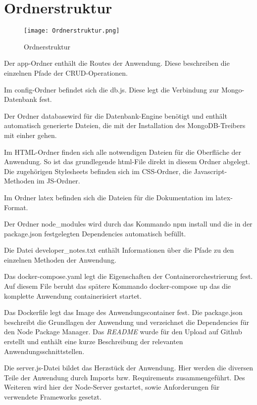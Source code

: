 
\chapter{Ordnerstruktur}
\label{ch:Ordnerstruktur}
\begin{wrapfigure}{r}{.4\textwidth}
\centering
\texttt{[image: Ordnerstruktur.png]}
\vspace{1pt}
\caption{Ordnerstruktur}
\label{fig:Ordnerstruktur}
\end{wrapfigure}

Der app-Ordner enthält die Routes der Anwendung. Diese beschreiben die einzelnen Pfade der \acs{CRUD}-Operationen.

Im config-Ordner befindet sich die \glqq db.js\grqq{}. Diese legt die Verbindung zur Mongo-Datenbank fest.

Der Ordner \glqq database\grqq{}wird für die Datenbank-Engine benötigt und enthält automatisch generierte Dateien, die mit der Installation des MongoDB-Treibers mit einher gehen.

Im \glqq \acs{HTML}\grqq{}-Ordner finden sich alle notwendigen Dateien für die Oberfläche der Anwendung. So ist das grundlegende html-File direkt in diesem Ordner abgelegt. Die zugehörigen Stylesheets befinden sich im \glqq \acs{CSS}\grqq{}-Ordner, die Javascript-Methoden im \acs{JS}-Ordner.

Im Ordner latex befinden sich die Dateien für die Dokumentation im latex-Format.

Der Ordner node\_modules wird durch das Kommando \glqq  npm install\grqq{} und die in der package.json festgelegten Dependencies automatisch befüllt.

Die Datei \glqq  developer\_notes.txt \grqq{} enthält Informationen über die Pfade zu den einzelnen Methoden der Anwendung.

Das \glqq docker-compose.yaml\grqq{} legt die Eigenschaften der Containerorchestrierung fest. Auf diesem File beruht das spätere Kommando \glqq  docker-compose up\grqq{} das die komplette Anwendung containerisiert startet.

Das Dockerfile legt das Image des Anwendungscontainer fest.
Die \glqq package.json\grqq{} beschreibt die Grundlagen der Anwendung und verzeichnet die Dependencies für den Node Package Manager.
Das \textit{README} wurde für den Upload auf Github erstellt und enthält eine kurze Beschreibung der relevanten Anwendungsschnittstellen.

Die \glqq server.js\grqq{}-Datei bildet das Herzstück der Anwendung. Hier werden die diversen Teile der Anwendung durch Imports bzw. Requirements zusammengeführt. Des Weiteren wird hier der Node-Server gestartet, sowie Anforderungen für verwendete Frameworks gesetzt.